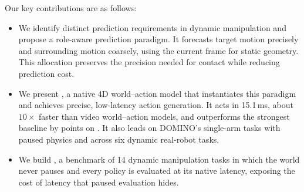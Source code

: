 




Our key contributions are as follows:
\begin{itemize}[leftmargin=*,topsep=2pt,itemsep=1pt]
\item We identify distinct prediction requirements in dynamic manipulation and
propose a role-aware prediction paradigm. It forecasts target motion precisely
and surrounding motion coarsely, using the current frame for static geometry.
This allocation preserves the precision needed for contact while reducing
prediction cost.
\item We present \textbf{\ours}, a native 4D world--action model that
instantiates this paradigm and achieves precise, low-latency action generation.
It acts in 15.1\,ms, about $10\times$ faster than video world--action models,
and outperforms the strongest baseline by \nativeLead{} points on \bench. It also leads
on DOMINO's single-arm tasks with paused physics and across six dynamic real-robot tasks.
\item We build \textbf{\bench}, a benchmark of 14 dynamic manipulation tasks in
which the world never pauses and every policy is evaluated at its native
latency, exposing the cost of latency that paused evaluation hides. 
\end{itemize}
